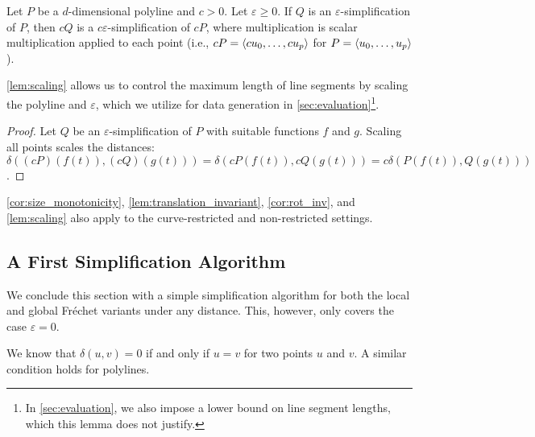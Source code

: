 \begin{lemma}\label{lem:scaling}
	Let \(P\) be a \(d\)-dimensional polyline and \(c > 0\). Let \(\varepsilon \geq 0\). If \(Q\) is an \(\varepsilon\)-simplification of \(P\), then \(cQ\) is a \(c\varepsilon\)-simplification of \(cP\), where multiplication is scalar multiplication applied to each point (i.e., \(cP = \left\langle cu_0, \dots, cu_p\right\rangle\) for \(P = \left\langle u_0,\dots, u_p\right\rangle\)).
\end{lemma}

\cref{lem:scaling} allows us to control the maximum length of line segments by scaling the polyline and \(\varepsilon\), which we utilize for data generation in \cref{sec:evaluation}\footnote{In \cref{sec:evaluation}, we also impose a lower bound on line segment lengths, which this lemma does not justify.}.

\begin{proof}
	Let \(Q\) be an \(\varepsilon\)-simplification of \(P\) with suitable functions \(f\) and \(g\). Scaling all points scales the distances: \(\delta((cP)(f(t)), (cQ)(g(t))) = \delta(cP(f(t)), cQ(g(t))) = c\delta(P(f(t)), Q(g(t)))\).
\end{proof}

\begin{remark}
	\cref{cor:size_monotonicity}, \cref{lem:translation_invariant}, \cref{cor:rot_inv}, and \cref{lem:scaling} also apply to the curve-restricted and non-restricted settings.
\end{remark}

\subsection{A First Simplification Algorithm}
We conclude this section with a simple simplification algorithm for both the local and global Fréchet variants under any distance. This, however, only covers the case \(\varepsilon = 0\).

We know that \(\delta(u, v) = 0\) if and only if \(u = v\) for two points \(u\) and \(v\). A similar condition holds for polylines.

